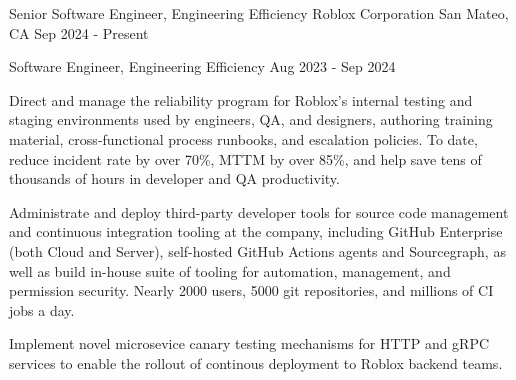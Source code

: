 \documentclass[]{awesome-cv}
\begin{document}
    
\begin{center}

	\makecvheader

\end{center}

\vspace{-2mm}

	

	\cventry
	{Senior Software Engineer, Engineering Efficiency}
	{Roblox Corporation}
	{San Mateo, CA}
	{Sep 2024 - Present}
	{}

	\vspace{-7mm}
	\cventry
	{Software Engineer, Engineering Efficiency}
	{}
	{}
	{Aug 2023 - Sep 2024}
	{\begin{cvitems}
		\item{Direct and manage the reliability program for Roblox's internal testing and staging environments used by engineers, QA, and designers, authoring training material, cross-functional process runbooks, and escalation policies. To date, reduce incident rate by over 70\%, MTTM by over 85\%, and help save tens of thousands of hours in developer and QA productivity.}
		\item{Administrate and deploy third-party developer tools for source code management and continuous integration tooling at the company, including GitHub Enterprise (both Cloud and Server), self-hosted GitHub Actions agents and Sourcegraph, as well as build in-house suite of tooling for automation, management, and permission security. Nearly 2000 users, 5000 git repositories, and millions of CI jobs a day.}
		\item{Implement novel microsevice canary testing mechanisms for HTTP and gRPC services to enable the rollout of continous deployment to Roblox backend teams.}
	\end{cvitems}}
\end{document}
